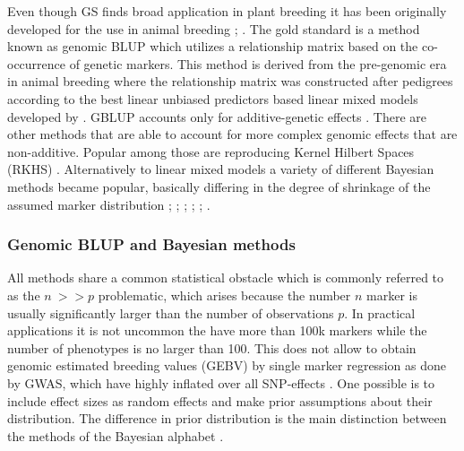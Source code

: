 Even though GS finds broad application in plant breeding it has been originally developed for the use in
animal breeding \cite{hayes2010genome}; \cite{goddard2011using}. The gold standard is a method known as
genomic BLUP \cite{vanraden2008efficient} which utilizes a relationship matrix based on the co-occurrence of
genetic markers. This method is derived from the pre-genomic era in animal breeding where the relationship
matrix was constructed after pedigrees according to the best linear unbiased predictors based linear mixed
models developed by \cite{henderson1975best}. GBLUP accounts only for additive-genetic effects
\cite{vanraden2008efficient}. There are other methods that are able to account for more complex genomic
effects that are non-additive. Popular among those are reproducing Kernel Hilbert Spaces (RKHS)
\cite{gianola2008reproducing}. Alternatively to linear mixed models a variety of different Bayesian methods
became popular, basically differing in the degree of shrinkage of the assumed marker distribution
\cite{hayes2001}; \cite{gianola2009}; \cite{habier2011}; \cite{gianola2013}; \cite{crossa2017};
\cite{azodi2019}.

\subsubsection{Genomic BLUP and Bayesian methods}

All methods share a common statistical obstacle which is commonly referred to as the $n\ >> p$ problematic,
which arises because the number $n$ marker is usually significantly larger than the number of observations
$p$. In practical applications it is not uncommon the have more than 100k markers while the number of
phenotypes is no larger than 100. This does not allow to obtain genomic estimated breeding values (GEBV) by
single marker regression as done by GWAS, which have highly inflated over all SNP-effects
\cite{korte2013advantages}. One possible is to include effect sizes as random effects and make prior
assumptions about their distribution. The difference in prior distribution is the main distinction between the
methods of the Bayesian alphabet
\cite{gianola2013}.\\

